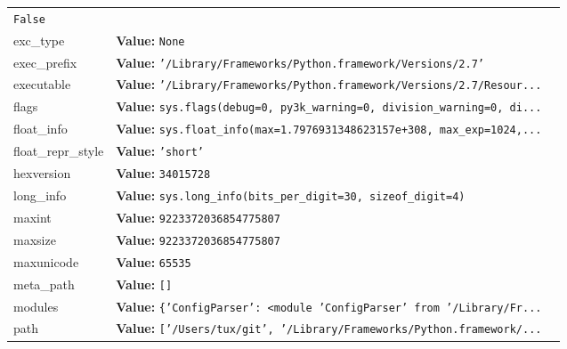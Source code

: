 \begin{longtable}{|p{\varnamewidth}|p{\vardescrwidth}|l}
{\tt False}&\\
\cline{1-2}
\raggedright e\-x\-c\-\_\-t\-y\-p\-e\- & \raggedright \textbf{Value:} 
{\tt None}&\\
\cline{1-2}
\raggedright e\-x\-e\-c\-\_\-p\-r\-e\-f\-i\-x\- & \raggedright \textbf{Value:} 
{\tt \texttt{'}\texttt{/Library/Frameworks/Python.framework/Versions/2.7}\texttt{'}}&\\
\cline{1-2}
\raggedright e\-x\-e\-c\-u\-t\-a\-b\-l\-e\- & \raggedright \textbf{Value:} 
{\tt \texttt{'}\texttt{/Library/Frameworks/Python.framework/Versions/2.7/Resour}\texttt{...}}&\\
\cline{1-2}
\raggedright f\-l\-a\-g\-s\- & \raggedright \textbf{Value:} 
{\tt sys.flags(debug=0, py3k\_warning=0, division\_warning=0, di\texttt{...}}&\\
\cline{1-2}
\raggedright f\-l\-o\-a\-t\-\_\-i\-n\-f\-o\- & \raggedright \textbf{Value:} 
{\tt sys.float\_info(max=1.7976931348623157e+308, max\_exp=1024,\texttt{...}}&\\
\cline{1-2}
\raggedright f\-l\-o\-a\-t\-\_\-r\-e\-p\-r\-\_\-s\-t\-y\-l\-e\- & \raggedright \textbf{Value:} 
{\tt \texttt{'}\texttt{short}\texttt{'}}&\\
\cline{1-2}
\raggedright h\-e\-x\-v\-e\-r\-s\-i\-o\-n\- & \raggedright \textbf{Value:} 
{\tt 34015728}&\\
\cline{1-2}
\raggedright l\-o\-n\-g\-\_\-i\-n\-f\-o\- & \raggedright \textbf{Value:} 
{\tt sys.long\_info(bits\_per\_digit=30, sizeof\_digit=4)}&\\
\cline{1-2}
\raggedright m\-a\-x\-i\-n\-t\- & \raggedright \textbf{Value:} 
{\tt 9223372036854775807}&\\
\cline{1-2}
\raggedright m\-a\-x\-s\-i\-z\-e\- & \raggedright \textbf{Value:} 
{\tt 9223372036854775807}&\\
\cline{1-2}
\raggedright m\-a\-x\-u\-n\-i\-c\-o\-d\-e\- & \raggedright \textbf{Value:} 
{\tt 65535}&\\
\cline{1-2}
\raggedright m\-e\-t\-a\-\_\-p\-a\-t\-h\- & \raggedright \textbf{Value:} 
{\tt \texttt{[}\texttt{]}}&\\
\cline{1-2}
\raggedright m\-o\-d\-u\-l\-e\-s\- & \raggedright \textbf{Value:} 
{\tt \texttt{\{}\texttt{'}\texttt{ConfigParser}\texttt{'}\texttt{: }{\textless}module 'ConfigParser' from '/Library/Fr\texttt{...}}&\\
\cline{1-2}
\raggedright p\-a\-t\-h\- & \raggedright \textbf{Value:} 
{\tt \texttt{[}\texttt{'}\texttt{/Users/tux/git}\texttt{'}\texttt{, }\texttt{'}\texttt{/Library/Frameworks/Python.framework/}\texttt{...}}&\\

\end{longtable}
